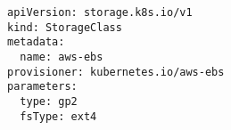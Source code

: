 \begin{verbatim}
apiVersion: storage.k8s.io/v1
kind: StorageClass
metadata:
  name: aws-ebs
provisioner: kubernetes.io/aws-ebs
parameters:
  type: gp2
  fsType: ext4
\end{verbatim}
